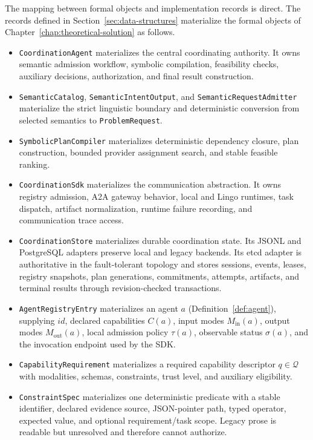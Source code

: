 The mapping between formal objects and implementation records is direct. The records defined in Section~\ref{sec:data-structures} materialize the formal objects of Chapter~\ref{chap:theoretical-solution} as follows.

\begin{itemize}
  \item \texttt{CoordinationAgent} materializes the central coordinating authority. It owns semantic admission workflow, symbolic compilation, feasibility checks, auxiliary decisions, authorization, and final result construction.
  \item \texttt{SemanticCatalog}, \texttt{SemanticIntentOutput}, and \texttt{SemanticRequestAdmitter} materialize the strict linguistic boundary and deterministic conversion from selected semantics to \texttt{ProblemRequest}.
  \item \texttt{SymbolicPlanCompiler} materializes deterministic dependency closure, plan construction, bounded provider assignment search, and stable feasible ranking.
  \item \texttt{CoordinationSdk} materializes the communication abstraction. It owns registry admission, A2A gateway behavior, local and Lingo runtimes, task dispatch, artifact normalization, runtime failure recording, and communication trace access.
  \item \texttt{CoordinationStore} materializes durable coordination state. Its JSONL and PostgreSQL adapters preserve local and legacy backends. Its etcd adapter is authoritative in the fault-tolerant topology and stores sessions, events, leases, registry snapshots, plan generations, commitments, attempts, artifacts, and terminal results through revision-checked transactions.
  \item \texttt{AgentRegistryEntry} materializes an agent $a$ (Definition~\ref{def:agent}), supplying $\mathit{id}$, declared capabilities $C(a)$, input modes $M_{\mathrm{in}}(a)$, output modes $M_{\mathrm{out}}(a)$, local admission policy $\tau(a)$, observable status $\sigma(a)$, and the invocation endpoint used by the SDK.
  \item \texttt{CapabilityRequirement} materializes a required capability descriptor $q \in \mathcal{Q}$ with modalities, schemas, constraints, trust level, and auxiliary eligibility.
  \item \texttt{ConstraintSpec} materializes one deterministic predicate with a stable identifier, declared evidence source, JSON-pointer path, typed operator, expected value, and optional requirement/task scope. Legacy prose is readable but unresolved and therefore cannot authorize.

\end{itemize}
